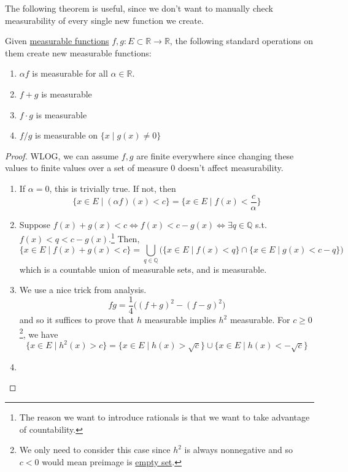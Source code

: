  The following theorem is useful, since we don't want to manually check measurability of every single new function we create. 

  \begin{theorem}
    \label{thm:arithmetic-on-measurable-functions}
    Given \hyperref[def:measurable-function]{measurable functions} $f, g: E \subset \mathbb{R} \to \mathbb{R}$, the following standard operations on them create new measurable functions: 
    \begin{enumerate}
      \item $\alpha f$ is measurable for all $\alpha \in \mathbb{R}$. 
      \item $f + g$ is measurable 
      \item $f \cdot g$ is measurable 
      \item $f / g$ is measurable on $\{x \mid g(x) \neq 0\}$ 
    \end{enumerate}
  \end{theorem} 
  \begin{proof}
    WLOG, we can assume $f, g$ are finite everywhere since changing these values to finite values over a set of measure $0$ doesn't affect measurability. 
    \begin{enumerate}
      \item If $\alpha = 0$, this is trivially true. If not, then 
      \begin{equation}
        \{ x \in E \mid (\alpha f) (x) < c \} = \{x \in E \mid f(x) < \frac{c}{\alpha} \} 
      \end{equation}

      \item Suppose $f(x) + g(x) < c \iff f(x) < c - g(x) \iff \exists q \in \mathbb{Q}$ s.t. $f(x) < q < c - g(x)$.\footnote{The reason we want to introduce rationals is that we want to take advantage of countability.} Then, 
      \begin{equation}
        \{x \in E \mid f(x) + g(x) < c \} = \bigcup_{q \in \mathbb{Q}} \big( \{x \in E \mid f(x) < q\} \cap \{x \in E \mid g(x) < c - q \}\big)
      \end{equation}
      which is a countable union of measurable sets, and is measurable. 

      \item We use a nice trick from analysis. 
      \begin{equation}
        fg = \frac{1}{4} \big( (f + g)^2 - (f - g)^2 \big) 
      \end{equation}
      and so it suffices to prove that $h$ measurable implies $h^2$ measurable. For $c \geq 0$\footnote{We only need to consider this case since $h^2$ is always nonnegative and so $c < 0$ would mean preimage is \hyperref[st-def:empty-set]{empty set}.}, we have 
      \begin{equation}
        \{ x \in E \mid h^2 (x) > c \} = \{x \in E \mid h(x) > \sqrt{c} \} \cup \{x \in E \mid h(x) < -\sqrt{c} \}
      \end{equation}

      \item 
    \end{enumerate}
  \end{proof}

